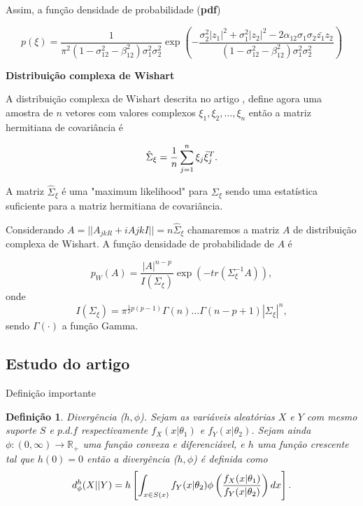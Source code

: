 \documentclass[12pt,a4paper]{article}
\newtheorem{definition}{Definição}[section]
\begin{document}
Assim, a função densidade de probabilidade ({\bf pdf}) 

\begin{equation}\label{eqn79}
	p(\xi)=\frac{1}{\pi^2(1 - \sigma_{12}^{2}- \beta_{12}^2)\sigma_{1}^2\sigma_{2}^2}\exp\left(-\frac{\sigma_2^2|z_1|^2+\sigma_1^2|z_2|^2-2\alpha_{12}\sigma_1\sigma_2\bar{z_1}z_2}{(1 - \sigma_{12}^{2}- \beta_{12}^2)\sigma_{1}^2\sigma_{2}^2}
\right)  
\end{equation}

{\bf Distribuição complexa de Wishart}

A distribuição complexa de Wishart descrita no artigo \cite{goodman1963}, define agora uma amostra de  $n$ vetores com valores complexos $\xi_1,\xi_2,\dots,\xi_n$ então a matriz hermitiana de covariância é 

\begin{equation}\label{eqn80}
	\hat{\Sigma}_{\xi}=\frac{1}{n}\sum_{j=1}^{n}\xi_j\bar{\xi}_{j}^{T} . \\
\end{equation}

A matriz $\hat{\Sigma}_{\xi}$ é uma "maximum likelihood" para $\Sigma_{\xi}$ sendo uma estatística suficiente para a matriz hermitiana de covariância.

Considerando $A=||A_{jkR}+iA{jkI}||=n\hat{\Sigma}_{\xi}$ chamaremos a matriz $A$ de distribuição complexa de Wishart. A função densidade de probabilidade de $A$ é


\begin{equation}\label{eqn81}
	p_W(A)=\frac{|A|^{n-p}}{I(\Sigma_{\xi})} \exp(-tr(\Sigma_{\xi}^{-1}A)), 
\end{equation}
onde
\begin{equation}\label{eqn82}
	I(\Sigma_{\xi})=\pi^{\frac{1}{2}p(p-1)}\Gamma(n)\dots\Gamma(n-p+1)|\Sigma_{\xi}|^n, 
\end{equation}
sendo $\Gamma(\cdot)$ a função Gamma.

\subsection{Estudo do artigo  \cite{salicru_pardo_1994}}

Definição importante  

\begin{definition}{Divergência ($h,\phi$).}
	Sejam as variáveis aleatórias $X$ e $Y$ com mesmo suporte $S$  e $p.d.f$ respectivamente $f_{X}(x|\theta_1)$ e $f_{Y}(x|\theta_2)$. Sejam ainda $\phi:(0,\infty)\rightarrow \mathbb{R}_+$ uma função convexa e diferenciável, e $h$ uma função crescente tal que $h(0)=0$ então a divergência ($h,\phi$) é definida como
\begin{equation}\label{eqn83}
	d_{\phi}^{h}(X||Y)=h\left[\int_{x\in S(x)} f_{Y}(x|\theta_2)\phi\left(\frac{f_{X}(x|\theta_1)}{f_{Y}(x|\theta_2)}\right)dx \right]. \\
\end{equation}
\end{definition}
\end{document}
